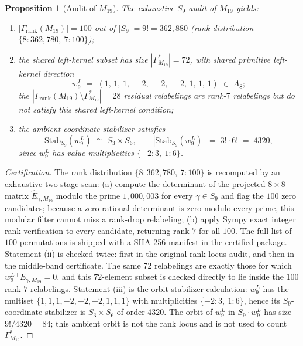 \documentclass[11pt,a4paper]{article}
\newtheorem{proposition}[theorem]{Proposition}
\theoremstyle{definition}
\theoremstyle{remark}
\newcommand{\GrankM}{\Gamma_{\mathrm{rank}}(M_{19})}
\newcommand{\GMninetn}{\Gamma^{*}_{M_{19}}}     %
\newcommand{\wleftnine}{w^{L}_{9}}
\newcommand{\StabWnine}{\mathrm{Stab}_{S_9}(\wleftnine)}
\begin{document}
\begin{proposition}[Audit of $M_{19}$]\label{prop:M19-audit}
The exhaustive $S_9$-audit of $M_{19}$ yields:
\begin{enumerate}
   \item[\rm (i)] $|\GrankM| = 100$ out of $|S_9| = 9! = 362{,}880$ (rank
   distribution $\{8 : 362{,}780,\ 7 : 100\}$);
   \item[\rm (ii)] the shared left-kernel subset has size $|\GMninetn| = 72$,
   with shared primitive left-kernel direction
   \begin{equation*}
      \wleftnine \;=\; (1,\, 1,\, 1,\, -2,\, -2,\, -2,\, 1,\, 1,\, 1) \;\in\; A_8;
   \end{equation*}
   the $|\GrankM \setminus \GMninetn| = 28$ residual relabelings are
   rank-$7$ relabelings but do not satisfy this shared left-kernel condition;
   \item[\rm (iii)] the ambient coordinate stabilizer satisfies
   \begin{equation*}
      \StabWnine \;\cong\; S_3 \times S_6,
      \qquad |\StabWnine| \;=\; 3!\cdot 6! \;=\; 4320,
   \end{equation*}
   since $\wleftnine$ has value-multiplicities $\{-2 : 3,\ 1 : 6\}$.
\end{enumerate}
\end{proposition}

\begin{proof}[Certification]
The rank distribution $\{8: 362{,}780,\ 7: 100\}$ is recomputed by an
exhaustive two-stage scan: (a) compute the determinant of the projected
$8\times 8$ matrix $\widehat{E}_{\gamma,M_{19}}$ modulo the prime
$1{,}000{,}003$ for every $\gamma\in S_9$ and flag the $100$ zero
candidates; because a zero rational determinant is zero modulo every
prime, this modular filter cannot miss a rank-drop relabeling; (b) apply
Sympy exact integer rank verification to every candidate, returning rank
$7$ for all $100$. The full list of $100$
permutations is shipped with a SHA-256 manifest in the certified
package. Statement (ii) is checked twice: first in the original rank-locus
audit, and then in the middle-band certificate. The same $72$ relabelings
are exactly those for which $\wleftnine{}^{\!\top}E_{\gamma,M_{19}}=0$,
and this $72$-element subset is checked directly to lie inside the $100$
rank-$7$ relabelings. Statement (iii) is the orbit-stabilizer calculation:
$\wleftnine$ has the multiset $\{1,1,1,-2,-2,-2,1,1,1\}$ with
multiplicities $\{-2 : 3,\ 1 : 6\}$, hence its $S_9$-coordinate
stabilizer is $S_3 \times S_6$ of order $4320$. The orbit of
$\wleftnine$ in $S_9\cdot\wleftnine$ has size $9!/4320 = 84$; this
ambient orbit is not the rank locus and is not used to count
$\GMninetn$.
\end{proof}
\end{document}
